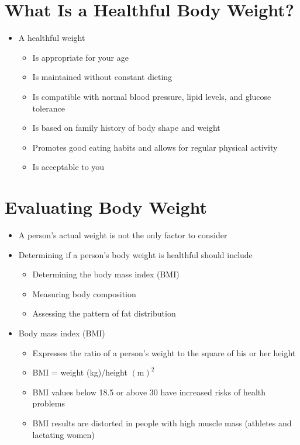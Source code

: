 \documentclass[title={Chapter 10: Achieving and Maintaining a Healthful Body Weight}]{fdsn201notes}
\begin{document}
%
%
%
%
\section{What Is a Healthful Body Weight?}\label{sec:what-is-a-healthful-body-weight?}
\begin{itemize}
	\item A healthful weight
	\begin{itemize}
		\item Is appropriate for your age
		\item Is maintained without constant dieting
		\item Is compatible with normal blood pressure, lipid levels, and glucose tolerance
		\item Is based on family history of body shape and weight
		\item Promotes good eating habits and allows for regular physical activity
		\item Is acceptable to you
	\end{itemize}
\end{itemize}

\section{Evaluating Body Weight}\label{sec:evaluating-body-weight}
\begin{itemize}
	\item A person’s actual weight is not the only factor to consider
	\item Determining if a person’s body weight is healthful should include
	\begin{itemize}
		\item Determining the body mass index (BMI)
		\item Measuring body composition
		\item Assessing the pattern of fat distribution
	\end{itemize}
	\item Body mass index (BMI)
	\begin{itemize}
		\item Expresses the ratio of a person’s weight to the square of his or her height
		\item BMI = weight (kg)/height $(\mbox{m})^{2}$
		\item BMI values below 18.5 or above 30 have increased risks of health problems
		\item BMI results are distorted in people with high muscle mass (athletes and lactating women)
	\end{itemize}
\end{itemize}
\end{document}
